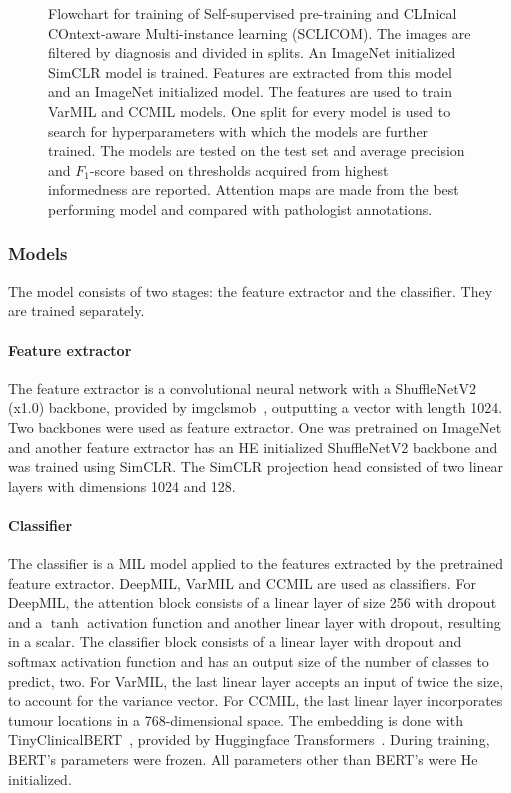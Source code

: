 \begin{figure}
    \caption[Flowchart of training SCLICOM.]{
        Flowchart for training of Self-supervised pre-training and CLInical COntext-aware Multi-instance learning (SCLICOM).
        The images are filtered by diagnosis and divided in splits.
        An ImageNet initialized SimCLR model is trained.
        Features are extracted from this model and an ImageNet initialized model.
        The features are used to train VarMIL and CCMIL models.
        One split for every model is used to search for hyperparameters with which the models are further trained.
        The models are tested on the test set and average precision and $F_1$-score based on thresholds acquired from highest informedness are reported.
        Attention maps are made from the best performing model and compared with pathologist annotations.
    }
\end{figure}

\subsubsection{Models}
The model consists of two stages: the feature extractor and the classifier.
They are trained separately.

\paragraph{Feature extractor}
The feature extractor is a convolutional neural network with a ShuffleNetV2 (x1.0) backbone, provided by imgclsmob~\cite{imgclsmob2023}, outputting a vector with length 1024.
Two backbones were used as feature extractor.
One was pretrained on ImageNet and another feature extractor has an HE initialized ShuffleNetV2 backbone and was trained using SimCLR.
The SimCLR projection head consisted of two linear layers with dimensions 1024 and 128.

\paragraph{Classifier}
The classifier is a MIL model applied to the features extracted by the pretrained feature extractor.
DeepMIL, VarMIL and CCMIL are used as classifiers.
For DeepMIL, the attention block consists of a linear layer of size 256 with dropout and a $\tanh$ activation function and another linear layer with dropout, resulting in a scalar.
The classifier block consists of a linear layer with dropout and $\mathrm{softmax}$ activation function and has an output size of the number of classes to predict, \ie two.
For VarMIL, the last linear layer accepts an input of twice the size, to account for the variance vector.
For CCMIL, the last linear layer incorporates tumour locations in a 768-dimensional space.
The embedding is done with TinyClinicalBERT~\cite{Rohanian2023}, provided by Huggingface Transformers~\cite{Wolf2020}.
During training, BERT's parameters were frozen.
All parameters other than BERT's were He initialized.

